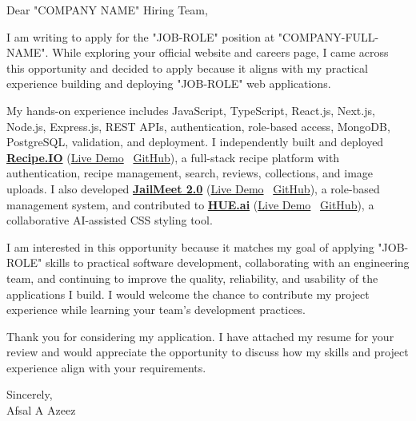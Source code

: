 \documentclass{resume}
\begin{document}
\makecoverletterhead
\makecoverletterdetails

Dear "COMPANY NAME" Hiring Team,

I am writing to apply for the "JOB-ROLE" position at "COMPANY-FULL-NAME". While exploring your official website and careers page, I came across this opportunity and decided to apply because it aligns with my practical experience building and deploying "JOB-ROLE" web applications.

My hands-on experience includes JavaScript, TypeScript, React.js, Next.js, Node.js, Express.js, REST APIs, authentication, role-based access, MongoDB, PostgreSQL, validation, and deployment. I independently built and deployed \href{https://rsp-project-xi.vercel.app/}{\textbf{Recipe.IO}} (\href{https://rsp-project-xi.vercel.app/}{Live Demo} \textbar\ \href{https://github.com/afsalazeez29-code/RSP-PROJECT}{GitHub}), a full-stack recipe platform with authentication, recipe management, search, reviews, collections, and image uploads. I also developed \href{https://jailmeet.vercel.app}{\textbf{JailMeet 2.0}} (\href{https://jailmeet.vercel.app}{Live Demo} \textbar\ \href{https://github.com/afsalazeez29-code/JailMeet2.0}{GitHub}), a role-based management system, and contributed to \href{https://hue-ai-xeao.vercel.app/}{\textbf{HUE.ai}} (\href{https://hue-ai-xeao.vercel.app/}{Live Demo} \textbar\ \href{https://github.com/Batch-11-1/Hue.ai}{GitHub}), a collaborative AI-assisted CSS styling tool.

I am interested in this opportunity because it matches my goal of applying "JOB-ROLE" skills to practical software development, collaborating with an engineering team, and continuing to improve the quality, reliability, and usability of the applications I build. I would welcome the chance to contribute my project experience while learning your team's development practices.

Thank you for considering my application. I have attached my resume for your review and would appreciate the opportunity to discuss how my skills and project experience align with your requirements.

Sincerely,\\[-1pt]
Afsal A Azeez
\end{document}

